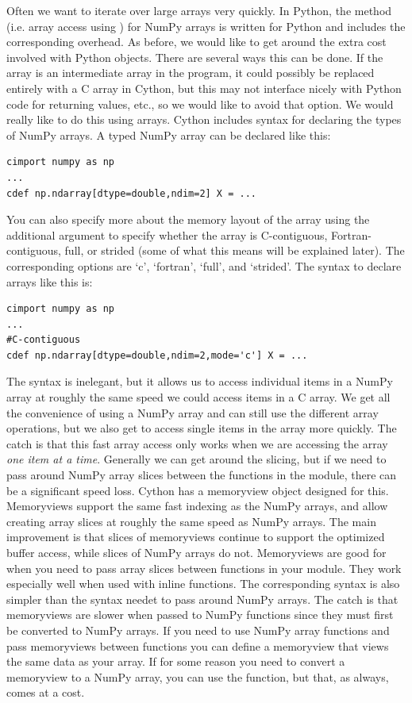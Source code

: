 Often we want to iterate over large arrays very quickly.
In Python, the  method (i.e. array access using \li{[ ]}) for NumPy arrays is written for Python and includes the corresponding overhead.
As before, we would like to get around the extra cost involved with Python objects.
There are several ways this can be done.
If the array is an intermediate array in the program, it could possibly be replaced entirely with a C array in Cython, but this may not interface nicely with Python code for returning values, etc., so we would like to avoid that option.
We would really like to do this using arrays.
Cython includes syntax for declaring the types of NumPy arrays.
A typed NumPy array can be declared like this:
\begin{lstlisting}
cimport numpy as np
...
cdef np.ndarray[dtype=double,ndim=2] X = ...
\end{lstlisting}
You can also specify more about the memory layout of the array using the additional argument  to specify whether the array is C-contiguous, Fortran-contiguous, full, or strided (some of what this means will be explained later).
The corresponding options are `c', `fortran', `full', and `strided'.
The syntax to declare arrays like this is:
\begin{lstlisting}
cimport numpy as np
...
#C-contiguous
cdef np.ndarray[dtype=double,ndim=2,mode='c'] X = ...
\end{lstlisting}
The syntax is inelegant, but it allows us to access individual items in a NumPy array at roughly the same speed we could access items in a C array.
We get all the convenience of using a NumPy array and can still use the different array operations, but we also get to access single items in the array more quickly.
The catch is that this fast array access only works when we are accessing the array \textit{one item at a time}.
Generally we can get around the slicing, but if we need to pass around NumPy array slices between the functions in the module, there can be a significant speed loss.
Cython has a memoryview object designed for this.
Memoryviews support the same fast indexing as the NumPy arrays, and allow creating array slices at roughly the same speed as NumPy arrays.
The main improvement is that slices of memoryviews continue to support the optimized buffer access, while slices of NumPy arrays do not.
Memoryviews are good for when you need to pass array slices between functions in your module.
They work especially well when used with inline functions.
The corresponding syntax is also simpler than the syntax needet to pass around NumPy arrays.
The catch is that memoryviews are slower when passed to NumPy functions since they must first be converted to NumPy arrays.
If you need to use NumPy array functions and pass memoryviews between functions you can define a memoryview that views the same data as your array.
If for some reason you need to convert a memoryview to a NumPy array, you can use the  function, but that, as always, comes at a cost.

